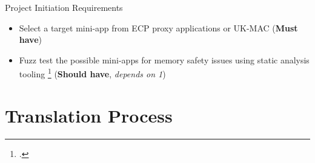 \documentclass[10pt,aspectratio=169]{beamer}
\newcommand{\cmark}{\ding{51}}
\newcommand{\done}{\rlap{$\square$}{\raisebox{2pt}{\large\hspace{1pt}\textcolor{green}{\cmark}}}\hspace{-2.5pt}}
\begin{document}

\begin{frame}{Project Initiation Requirements}
    \begin{itemize}
        \item[\done\ \ 1.]
          Select a target mini-app from ECP proxy applications or UK-MAC
          (\textbf{Must have})
        \item[\done\ \ 2.]
          Fuzz test the possible mini-apps for memory safety issues using static analysis tooling \footcite{stepanovMemorySanitizerFastDetector2015}
          (\textbf{Should have}, \textit{depends on 1})
    \end{itemize}
\end{frame}
    






\section{Translation Process}
\end{document}
